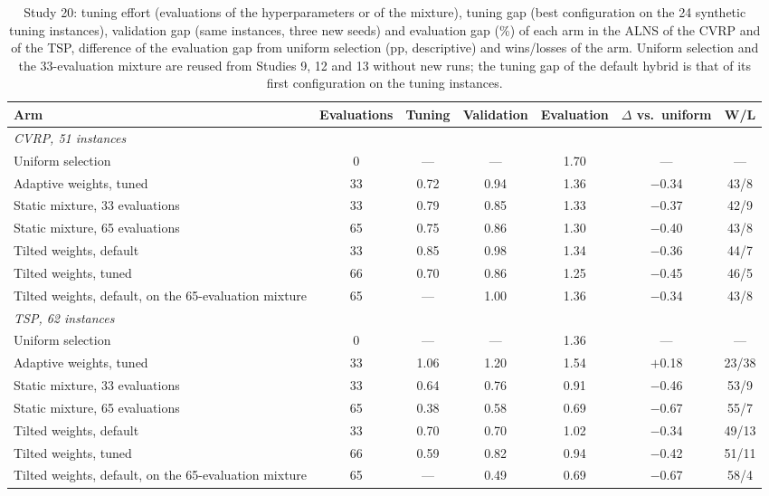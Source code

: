 \begin{table}[t]
\caption{Study 20: tuning effort (evaluations of the hyperparameters or of the mixture), tuning gap (best configuration on the 24 synthetic tuning instances), validation gap (same instances, three new seeds) and evaluation gap (\%) of each arm in the ALNS of the CVRP and of the TSP, difference of the evaluation gap from uniform selection (pp, descriptive) and wins/losses of the arm. Uniform selection and the 33-evaluation mixture are reused from Studies 9, 12 and 13 without new runs; the tuning gap of the default hybrid is that of its first configuration on the tuning instances.}\label{tab:s20a}
\centering
\small
\begin{adjustbox}{max width=\linewidth}
\begin{tabular}{lcccccc}
\toprule
Arm & Evaluations & Tuning & Validation & Evaluation & $\Delta$ vs.\ uniform & W/L \\
\midrule
\multicolumn{7}{l}{\emph{CVRP, 51 instances}} \\
Uniform selection & 0 & --- & --- & 1.70 & --- & --- \\
Adaptive weights, tuned & 33 & 0.72 & 0.94 & 1.36 & $-$0.34 & 43/8 \\
Static mixture, 33 evaluations & 33 & 0.79 & 0.85 & 1.33 & $-$0.37 & 42/9 \\
Static mixture, 65 evaluations & 65 & 0.75 & 0.86 & 1.30 & $-$0.40 & 43/8 \\
Tilted weights, default & 33 & 0.85 & 0.98 & 1.34 & $-$0.36 & 44/7 \\
Tilted weights, tuned & 66 & 0.70 & 0.86 & 1.25 & $-$0.45 & 46/5 \\
Tilted weights, default, on the 65-evaluation mixture & 65 & --- & 1.00 & 1.36 & $-$0.34 & 43/8 \\
\multicolumn{7}{l}{\emph{TSP, 62 instances}} \\
Uniform selection & 0 & --- & --- & 1.36 & --- & --- \\
Adaptive weights, tuned & 33 & 1.06 & 1.20 & 1.54 & $+$0.18 & 23/38 \\
Static mixture, 33 evaluations & 33 & 0.64 & 0.76 & 0.91 & $-$0.46 & 53/9 \\
Static mixture, 65 evaluations & 65 & 0.38 & 0.58 & 0.69 & $-$0.67 & 55/7 \\
Tilted weights, default & 33 & 0.70 & 0.70 & 1.02 & $-$0.34 & 49/13 \\
Tilted weights, tuned & 66 & 0.59 & 0.82 & 0.94 & $-$0.42 & 51/11 \\
Tilted weights, default, on the 65-evaluation mixture & 65 & --- & 0.49 & 0.69 & $-$0.67 & 58/4 \\
\bottomrule
\end{tabular}
\end{adjustbox}
\end{table}
